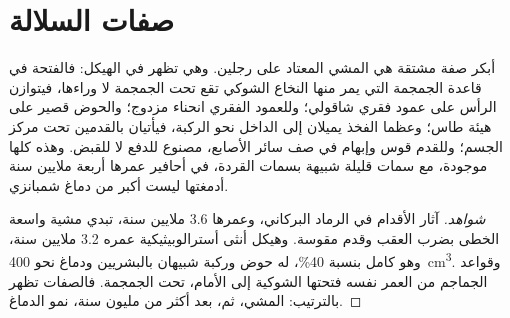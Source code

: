 \section{صفات السلالة}

\begin{proposition}\label{prop:g12:human-evolution:bipedalism}
أبكر صفة مشتقة  هي المشي المعتاد على رجلين. وهي تظهر في
الهيكل: فالفتحة في قاعدة الجمجمة التي يمر منها النخاع الشوكي تقع تحت
الجمجمة لا وراءها، فيتوازن الرأس على عمود فقري شاقولي؛ وللعمود الفقري
انحناء مزدوج؛ والحوض قصير على هيئة طاس؛ وعظما الفخذ يميلان إلى الداخل
نحو الركبة، فيأتيان بالقدمين تحت مركز الجسم؛ وللقدم قوس وإبهام في صف
سائر الأصابع، مصنوع للدفع لا للقبض. وهذه كلها موجودة، مع سمات قليلة
شبيهة بسمات القردة، في أحافير عمرها أربعة ملايين سنة أدمغتها ليست أكبر
من دماغ شمبانزي.
\end{proposition}
\begin{proof}[شواهد]
آثار الأقدام في الرماد البركاني، وعمرها 3.6 ملايين سنة، تبدي مشية
واسعة الخطى بضرب العقب وقدم مقوسة. وهيكل أنثى أسترالوبيثيكية عمره 3.2
ملايين سنة، وهو كامل بنسبة 40\%، له حوض وركبة شبيهان بالبشريين ودماغ
نحو \qty{400}{cm^3}. وقواعد الجماجم من العمر نفسه فتحتها الشوكية إلى
الأمام، تحت الجمجمة. فالصفات تظهر بالترتيب: المشي، ثم، بعد أكثر من
مليون سنة، نمو الدماغ.
\end{proof}

